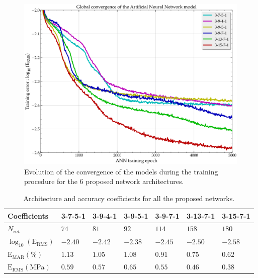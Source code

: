 \documentclass[metals,article,submit,pdftex,moreauthors]{Definitions/mdpi}
\DeclareRobustCommand{\RMSE}{\text{E}_\text{RMS}}
\DeclareRobustCommand{\MARE}{\text{E}_\text{MAR}}
\DeclareRobustCommand{\MPa}{\text{MPa}}
\begin{document}
\begin{figure}[H]
\centering
\includegraphics[width=0.7\columnwidth]{Figures/Conv-ANN-6}
\caption{Evolution of the convergence of the models during the training procedure for the 6 proposed network architectures.}
\label{fig:ANN-conv}
\end{figure}

\begin{table}[H]
\caption{Architecture and accuracy coefficients for all the proposed networks.}
\begin{tabularx}{\textwidth}{LCCCCCC}
\toprule
\textbf{Coefficients} & \textbf{3-7-5-1} & \textbf{3-9-4-1} & \textbf{3-9-5-1} & \textbf{3-9-7-1} & \textbf{3-13-7-1} & \textbf{3-15-7-1} \\
\hline
$N_{int}$ & $74$ & $81$ & $92$ & $114$ & $158$ &$180$\\
\toprule
$\log_{10}(\RMSE)$ & $-2.40$ & $-2.42$ & $-2.38$ & $-2.45$ & $-2.50$ & $-2.58$ \\
$\MARE(\%)$ & $1.13$ & $1.05$ & $1.08$ & $0.91$ & $0.75$ & $0.62$ \\
$\RMSE(\MPa)$ & $0.59$ & $0.57$ & $0.65$ & $0.55$ & $0.46$ & $0.38$ \\
\bottomrule
\end{tabularx}
\label{tab:Errors}
\end{table}
\end{document}

